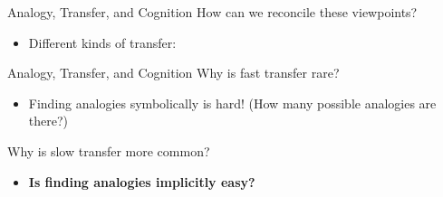 \documentclass{beamer}
\begin{document}
\begin{frame}{Analogy, Transfer, and Cognition}
How can we reconcile these viewpoints?
\begin{itemize}
    \item<2-> Different kinds of transfer:
\end{itemize}
\end{frame}

\begin{frame}{Analogy, Transfer, and Cognition}
Why is fast transfer rare?
\begin{itemize}
    \item<1-> Finding analogies symbolically is hard! (How many possible analogies are there?)  
\end{itemize}
Why is slow transfer more common?
\begin{itemize}
    \item<1-> \textbf{Is finding analogies implicitly easy?}
\end{itemize}
\end{frame}
\end{document}
